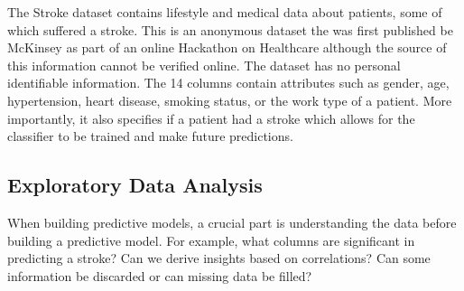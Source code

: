 \documentclass[proposal]{softeng}
\begin{document}
The Stroke dataset\cite{strokedataset} contains lifestyle and medical data about patients, some of which suffered a stroke. This is an anonymous dataset the was first published be McKinsey as part of an online Hackathon on Healthcare although the source of this information cannot be verified online. The dataset has no personal identifiable information. The 14 columns contain attributes such as gender, age, hypertension, heart disease, smoking status, or the work type of a patient. More importantly, it also specifies if a patient had a stroke which allows for the classifier to be trained and make future predictions.

\subsection{Exploratory Data Analysis}
When building predictive models, a crucial part is understanding the data before building a predictive model. For example, what columns are significant in predicting a stroke? Can we derive insights based on correlations? Can some information be discarded or can missing data be filled?
\end{document}
